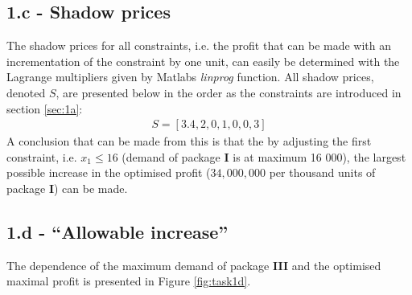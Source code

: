 \documentclass[]{article}
\begin{document}
\subsection*{1.c - Shadow prices}
The shadow prices for all constraints, i.e. the profit that can be made with an incrementation of the constraint by one unit, can easily be determined with the Lagrange multipliers given by Matlabs \textit{linprog} function.
All shadow prices, denoted $S$, are presented below in the order as the constraints are introduced in section \ref{sec:1a}:
\begin{align*}
  S = [3.4, 2, 0, 1, 0, 0, 3]
\end{align*}
A conclusion that can be made from this is that the by adjusting the first constraint, i.e. $x_1 \leq 16$ (demand of package \textbf{I} is at maximum 16 000), the largest possible increase in the optimised profit ($34,000,000$ per thousand units of package \textbf{I}) can be made.

\subsection*{1.d - ``Allowable increase''}
The dependence of the maximum demand of package \textbf{III} and the optimised maximal profit is presented in Figure \ref{fig:task1d}.
\end{document}
